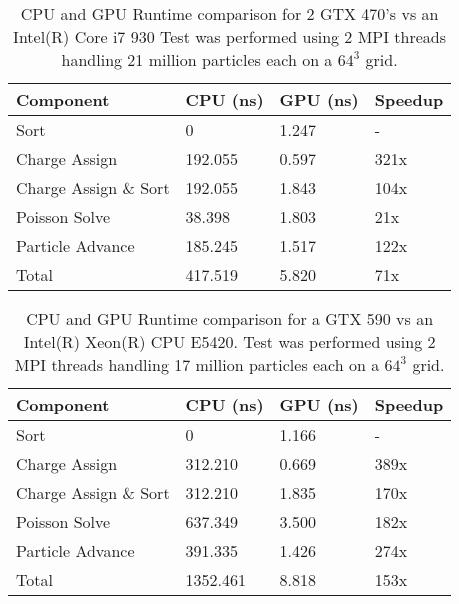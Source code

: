 \begin{table}[ht]
\begin{tabular}{| p{4.0cm} | p{3.5cm} | p{2.5cm} | p{4.0cm} |}
\hline
Component & CPU (ns) & GPU (ns) & Speedup \\ \hline
Sort & 0 & 1.247 & - \\ \hline
Charge Assign & 192.055 & 0.597 & 321x \\ \hline
Charge Assign \& Sort & 192.055 & 1.843 & 104x \\ \hline
Poisson Solve & 38.398 & 1.803 & 21x \\ \hline
Particle Advance & 185.245 & 1.517 & 122x \\ \hline
Total\footnote[1] & 417.519 & 5.820 & 71x \\ \hline
\end{tabular}
\caption[CPU and GPU Runtime comparison 1]{CPU and GPU Runtime comparison for 2 GTX 470's vs an Intel(R) Core i7 930 Test was performed using 2 MPI threads handling 21 million particles each on a $64^3$ grid.}
\label{tab:speedup} 
\end{table}

\begin{table}[ht]
\begin{tabular}{| p{4.0cm} | p{3.5cm} | p{2.5cm} | p{4.0cm} |}
\hline
Component & CPU (ns) & GPU (ns) & Speedup \\ \hline
Sort & 0 & 1.166 & - \\ \hline
Charge Assign & 312.210 & 0.669 & 389x \\ \hline
Charge Assign \& Sort & 312.210 & 1.835 & 170x \\ \hline
Poisson Solve & 637.349 & 3.500 & 182x \\ \hline
Particle Advance & 391.335 & 1.426 & 274x \\ \hline
Total\footnote[1] & 1352.461 & 8.818 & 153x \\ \hline
\end{tabular}
\caption[CPU and GPU Runtime comparison 2]{CPU and GPU Runtime comparison for a GTX 590 vs an Intel(R) Xeon(R) CPU E5420. Test was performed using 2 MPI threads handling 17 million particles each on a $64^3$ grid.}
\label{tab:speedup2} 
\end{table} 


\clearpage
\newpage
